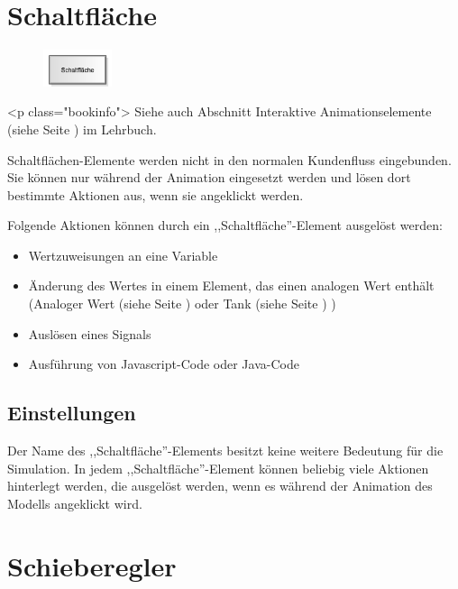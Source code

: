 \section{Schaltfläche}
\label{ref:ModelElementInteractiveButton}

\begin{figure}
\vspace{-22pt}
\includegraphics[width=2cm]{imageModelElementInteractiveButton.png}
\vspace{-22pt}
\end{figure}

<p class="bookinfo">
Siehe auch Abschnitt Interaktive Animationselemente (siehe Seite \pageref{ref:book:8.12.4}) im Lehrbuch.

Schaltflächen-Elemente werden nicht in den normalen Kundenfluss eingebunden.
Sie können nur während der Animation eingesetzt werden und lösen dort bestimmte
Aktionen aus, wenn sie angeklickt werden.

Folgende Aktionen können durch ein ,,Schaltfläche''-Element ausgelöst werden:

\begin{itemize}
  \item Wertzuweisungen an eine Variable 
  \item Änderung des Wertes in einem Element, das einen analogen Wert enthält
  (Analoger Wert (siehe Seite \pageref{ref:ModelElementAnalogValue}) oder Tank (siehe Seite \pageref{ref:ModelElementTank}) )
  \item Auslösen eines Signals 
  \item Ausführung von Javascript-Code oder Java-Code 
\end{itemize}

\subsection*{Einstellungen}

Der Name des ,,Schaltfläche''-Elements besitzt keine weitere Bedeutung für die Simulation.
In jedem ,,Schaltfläche''-Element können beliebig viele Aktionen hinterlegt werden, die
ausgelöst werden, wenn es während der Animation des Modells angeklickt wird.


\section{Schieberegler}
\label{ref:ModelElementInteractiveSlider}

